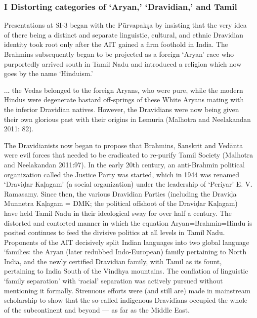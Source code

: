 \subsubsection*{I Distorting categories of ‘Aryan,’ ‘Dravidian,’ and Tamil}

Presentations at SI-3 began with the Pūrvapakşa by insisting that the very idea of there being a distinct and separate linguistic, cultural, and ethnic Dravidian identity took root only after the AIT gained a firm foothold in India. The Brahmins subsequently began to be projected as a foreign ‘Aryan’ race who purportedly arrived south in Tamil Nadu and introduced a religion which now goes by the name ‘Hinduism.’

\begin{myquote}
... the Vedas belonged to the foreign Aryans, who were pure, while the modern Hindus were degenerate bastard off-springs of these White Aryans mating with the inferior Dravidian natives. However, the Dravidians were now being given their own glorious past with their origins in Lemuria (Malhotra and Neelakandan 2011: 82).
\end{myquote}

The Dravidianists now began to propose that Brahmins, Sanskrit and Vedānta were evil forces that needed to be eradicated to re-purify Tamil Society (Malhotra and Neelakandan 2011:97). In the early 20th century, an anti-Brahmin political organization called the Justice Party was started, which in 1944 was renamed ‘Draviḍar Kaļagam’ (a social organization) under the leadership of ‘Periyar’ E. V. Ramasamy. Since then, the various Dravidian Parties (including the Draviḍa Munnetra Kaļagam = DMK; the political offshoot of the Draviḍar Kaļagam) have held Tamil Nadu in their ideological sway for over half a century. The distorted and contorted manner in which the equation Aryan=Brahmin=Hindu is posited continues to feed the divisive politics at all levels in Tamil Nadu. Proponents of the AIT decisively split Indian languages into two global language ‘families: the Aryan (later redubbed Indo-European) family pertaining to North India, and the newly certified Dravidian family, with Tamil as its fount, pertaining to India South of the Vindhya mountains. The conflation of linguistic ‘family separation’ with ‘racial’ separation was actively pursued without mentioning it formally. Strenuous efforts were (and still are) made in mainstream scholarship to show that the so-called indigenous Dravidians occupied the whole of the subcontinent and beyond — as far as the Middle East.


